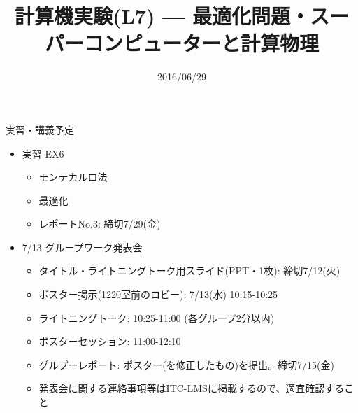 \documentclass[dvipdfmx]{beamer}
\title{計算機実験(L7) --- 最適化問題・スーパーコンピューターと計算物理}
\date{2016/06/29}
\begin{document}
\begin{frame}
  \titlepage
  \tableofcontents
\end{frame}








\section{}

\begin{frame}[t,fragile]{実習・講義予定}
  \begin{itemize}
    \setlength{\itemsep}{1em}
  \item 実習 EX6
    \begin{itemize}
    \item モンテカルロ法
    \item 最適化
    \item レポートNo.3: 締切7/29(金)
    \end{itemize}
  \item 7/13 グループワーク発表会
    \begin{itemize}
    \item タイトル・ライトニングトーク用スライド(PPT・1枚): 締切7/12(火)
    \item ポスター掲示(1220室前のロビー): 7/13(水) 10:15-10:25
    \item ライトニングトーク: 10:25-11:00 (各グループ2分以内)
    \item ポスターセッション: 11:00-12:10
    \item グルプーレポート: ポスター(を修正したもの)を提出。締切7/15(金)
    \item 発表会に関する連絡事項等はITC-LMSに掲載するので、適宜確認すること
    \end{itemize}
  \end{itemize}
\end{frame}
\end{document}
